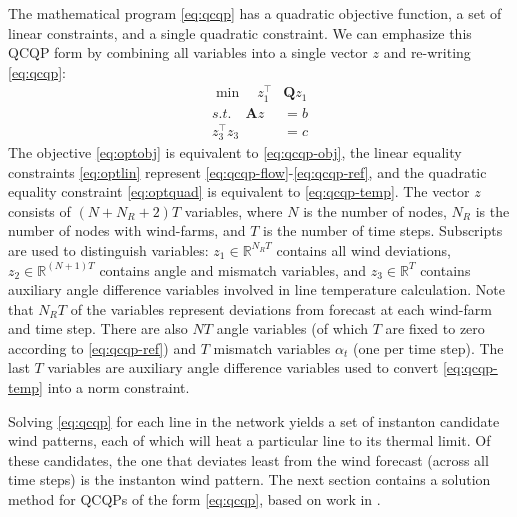 \documentclass[journal,twoside]{IEEEtran}
\begin{document}
The mathematical program \eqref{eq:qcqp} has a quadratic objective function, a set of linear constraints, and a single quadratic constraint. We can emphasize this QCQP form by combining all variables into a single vector $z$ and re-writing \eqref{eq:qcqp}:
\begin{subequations}\label{eq:opt}
\begin{align}
\label{eq:optobj} \min\quad z_1^\top &\mathbf{Q} z_1 \\
\label{eq:optlin}s.t.\quad \mathbf{A}z &= b \\
\label{eq:optquad}z_3^\top z_3 &= c
\end{align}
\end{subequations}
The objective \eqref{eq:optobj} is equivalent to \eqref{eq:qcqp-obj}, the linear equality constraints \eqref{eq:optlin} represent \eqref{eq:qcqp-flow}-\eqref{eq:qcqp-ref}, and the quadratic equality constraint \eqref{eq:optquad} is equivalent to \eqref{eq:qcqp-temp}. The vector $z$ consists of $(N+N_R+2)T$ variables, where $N$ is the number of nodes, $N_R$ is the number of nodes with wind-farms, and $T$ is the number of time steps. Subscripts are used to distinguish variables: $z_1\in\mathbb{R}^{N_RT}$ contains all wind deviations, $z_2\in\mathbb{R}^{(N+1)T}$ contains angle and mismatch variables, and $z_3\in\mathbb{R}^T$ contains auxiliary angle difference variables involved in line temperature calculation. Note that $N_RT$ of the variables represent deviations from forecast at each wind-farm and time step. There are also $NT$ angle variables (of which $T$ are fixed to zero according to \eqref{eq:qcqp-ref}) and $T$ mismatch variables $\alpha_t$ (one per time step). The last $T$ variables are auxiliary angle difference variables used to convert \eqref{eq:qcqp-temp} into a norm constraint.

Solving \eqref{eq:qcqp} for each line in the network yields a set of instanton candidate wind patterns, each of which will heat a particular line to its thermal limit. Of these candidates, the one that deviates least from the wind forecast (across all time steps) is the instanton wind pattern. The next section contains a solution method for QCQPs of the form \eqref{eq:qcqp}, based on work in \cite{bienstock2014}.
\end{document}
